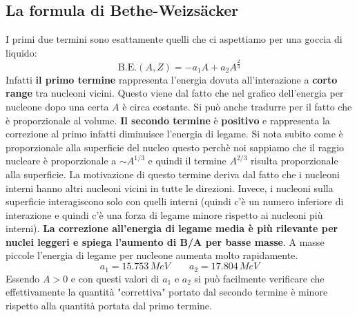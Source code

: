 \subsection{La formula di Bethe-Weizs\"acker}
I primi due termini sono esattamente quelli che ci aspettiamo per una goccia di liquido:
\begin{equation*}
    \text{B.E.}(A,Z)=-a_{1}A+a_{2}A^{\frac{2}{3}}
\end{equation*}
Infatti \textbf{il primo termine} rappresenta l'energia dovuta all'interazione a \textbf{corto range} tra nucleoni vicini. Questo viene dal fatto che nel grafico dell'energia per nucleone dopo una certa $A$ è circa costante. Si può anche tradurre per il fatto che è proporzionale al volume. \textbf{Il secondo termine} è \textbf{positivo} e rappresenta la correzione al primo infatti diminuisce l'energia di legame. Si nota subito come è proporzionale alla superficie del nucleo questo perchè noi sappiamo che il raggio nucleare è proporzionale a $\sim A^{1/3}$ e quindi il termine $A^{2/3}$ risulta proporzionale alla superficie. La motivazione di questo termine deriva dal fatto che i nucleoni interni hanno altri nucleoni vicini in tutte le direzioni. Invece, i nucleoni sulla superficie interagiscono solo con quelli interni (quindi c'è un numero inferiore di interazione e quindi c'è una forza di legame minore rispetto ai nucleoni più interni). \textbf{La correzione all'energia di legame media è più rilevante per nuclei leggeri e spiega l'aumento di B/A per basse masse}. A masse piccole l'energia di legame per nucleone aumenta molto rapidamente.
\begin{equation*}
    a_1=15.753\,MeV \qquad a_2=17.804\,MeV
\end{equation*}
Essendo $A>0$ e con questi valori di $a_1$ e $a_2$ si può facilmente verificare che effettivamente la quantità "correttiva" portato dal secondo termine è minore rispetto alla quantità portata dal primo termine.

